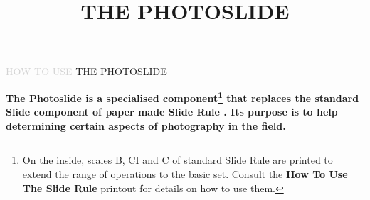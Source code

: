 
\usepackage{background}
\usetikzlibrary{calc}
\usepackage{color}
\usepackage{fixltx2e}
\usepackage{unicode-math}
\usepackage{fancybox}
\usepackage{amsmath}
\usepackage{graphicx}



\newcommand{\makefulltitle}{How To Use The Photoslide }



\title{\fontsize{60}{60}\selectfont THE PHOTOSLIDE}
\preauthor{}\postauthor{}\author{}
\predate{}\postdate{}\date{}
\everymath{\displaystyle}


  \begin{center}
    \headingfont\fontsize{28}{28}\selectfont \textcolor{lightgray}{HOW TO USE} THE PHOTOSLIDE
  \end{center}

  \nosection{}
  \large\textbf{The Photoslide is a specialised component\footnote{On the inside, scales B, CI and C of standard Slide Rule are printed to extend the range of operations to the basic set. Consult the \textbf{How To Use The Slide Rule} printout for details on how to use them.} that replaces the standard Slide component of paper made Slide Rule \modelname. Its purpose is to help determining certain aspects of photography in the field. }

